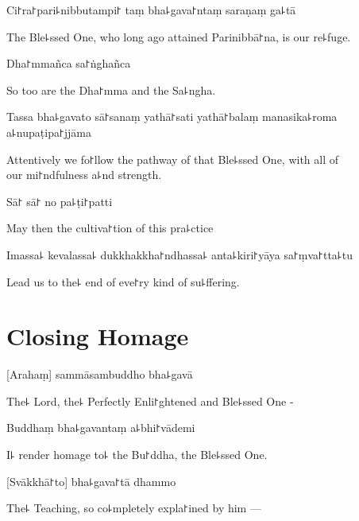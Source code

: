 Ci꜓ra꜓pari꜕nibbutampi꜓ taṃ bha꜕gava꜓ntaṃ saraṇaṃ ga꜕tā

\begin{english}
  The Ble꜕ssed One, who long ago attained Parinibbā꜓na, is our re꜕fuge.
\end{english}

Dha꜓mmañca sa꜓ṅghañca

\begin{english}
  So too are the Dha꜓mma and the Sa꜕ngha.
\end{english}

Tassa bha꜕gavato sā꜓sanaṃ yathā꜓sati yathā꜓balaṃ manasika꜕roma a꜕nupaṭipa꜓jjāma

\begin{english}
  Attentively we fo꜓llow the pathway of that Ble꜕ssed One, with all of \\our mi꜓ndfulness a꜕nd strength.
\end{english}

Sā꜓ sā꜓ no pa꜕ṭi꜓patti

\begin{english}
  May then the cultiva꜓tion of this pra꜕ctice
\end{english}

Imassa꜕ kevalassa꜕ dukkhakkha꜓ndhassa꜕ anta꜕kiri꜓yāya sa꜓ṃva꜓tta꜕tu

\begin{english}
  Lead us to the꜕ end of eve꜓ry kind of su꜕ffering.
\end{english}

\clearpage

\chapter{Closing Homage}                            %

%
[Arahaṃ] sammāsambuddho bha꜕gavā

\begin{english}
  The꜕ Lord, the꜕ Perfectly Enli꜓ghtened and Ble꜕ssed One -
\end{english}

Buddhaṃ bha꜕gavantaṃ a꜕bhi꜓vādemi

\begin{english}
  I꜕ render homage to꜕ the Bu꜓ddha, the Ble꜕ssed One.
\end{english}

[Svākkhā꜓to] bha꜕gava꜓tā dhammo

\begin{english}
  The꜕ Teaching, so co꜕mpletely expla꜓ined by him ---
\end{english}

